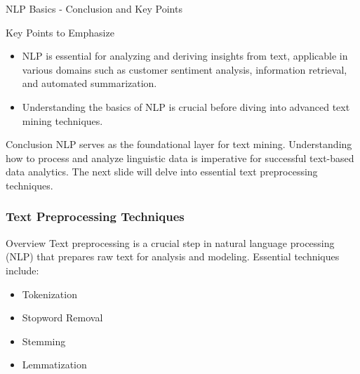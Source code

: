 \documentclass[aspectratio=169]{beamer}
\begin{document}
\begin{frame}[fragile]{NLP Basics - Conclusion and Key Points}
    \begin{block}{Key Points to Emphasize}
        \begin{itemize}
            \item NLP is essential for analyzing and deriving insights from text, applicable in various domains such as customer sentiment analysis, information retrieval, and automated summarization.
            \item Understanding the basics of NLP is crucial before diving into advanced text mining techniques.
        \end{itemize}
    \end{block}
    
    \begin{block}{Conclusion}
        NLP serves as the foundational layer for text mining. 
        Understanding how to process and analyze linguistic data is imperative for successful text-based data analytics. 
        The next slide will delve into essential text preprocessing techniques.
    \end{block}
\end{frame}

\begin{frame}[fragile]
    \frametitle{Text Preprocessing Techniques}
    \begin{block}{Overview}
        Text preprocessing is a crucial step in natural language processing (NLP) that prepares raw text for analysis and modeling. 
        Essential techniques include:
        \begin{itemize}
            \item Tokenization
            \item Stopword Removal
            \item Stemming
            \item Lemmatization
        \end{itemize}
    \end{block}
\end{frame}
\end{document}
